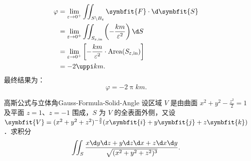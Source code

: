 \begin{solution}
\begin{equation}
\begin{aligned}
            \varphi & = \lim_{\varepsilon \to 0^+} \iint_{S \setminus B_\varepsilon} \symbfit{F} \cdot \d \symbfit{S}                             \\
                    & = \lim_{\varepsilon \to 0^+} \iint_{S_{\varepsilon, \text{in}}} \left( -\frac{km}{\varepsilon^2} \right) \d S               \\
                    & = \lim_{\varepsilon \to 0^+} \left[ -\frac{km}{\varepsilon^2} \cdot \operatorname{Area}(S_{\varepsilon, \text{in}}) \right] \\
                    & = -2\uppi km.
        \end{aligned}
    \end{equation}
    最终结果为：
    \begin{equation}
        \label{eq:final-ans-3}
        \varphi = \boxed{-2\uppi km}.
    \end{equation}
\end{solution}

\begin{problem}{高斯公式与立体角}{Gauss-Formula-Solid-Angle}
    设区域 $V$ 是由曲面 $x^2+y^2-\frac{z^2}{2}=1$ 及平面 $z=1$、$z=-1$ 围成，$S$ 为 $V$ 的全表面外侧，又设 $\symbfit{V} = (x^2+y^2+z^2)^{-\frac{3}{2}}(x\symbfit{i}+y\symbfit{j}+z\symbfit{k})$．求积分
    \begin{equation}
        \label{eq:integral-def-1}
        \iint_S \frac{x \d y \d z + y \d z \d x + z \d x \d y}{\sqrt{(x^2+y^2+z^2)^3}}.
    \end{equation}
\end{problem}


